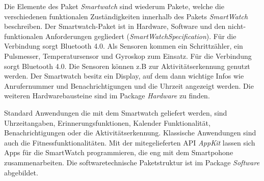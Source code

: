 Die Elemente des Paket \textit{Smartwatch} sind wiederum Pakete, welche die verschiedenen funktionalen Zuständigkeiten innerhalb des Pakets \textit{SmartWatch} beschreiben.
Der Smartwatch-Paket ist in Hardware, Software und den nicht-funktionalen Anforderungen
gegliedert (\textit{SmartWatchSpecification}).
Für die Verbindung sorgt Bluetooth 4.0.
Als Sensoren kommen ein Schrittzähler, ein Pulsmesser, Temperatursensor und Gyroskop zum Einsatz. Für die Verbindung sorgt Bluetooth 4.0.
Die Sensoren können z.B zur Aktivitätserkennung genutzt werden.
Der Smartwatch besitz ein Display, auf dem dann wichtige Infos wie Anrufernummer und Benachrichtigungen und die Uhrzeit angezeigt werden.
Die weiteren Hardwarebausteine sind im Package \textit{Hardware} zu finden.

Standard Anwendungen die mit dem Smartwatch geliefert werden, sind Uhrzeitangaben, Erinnerungsfunktionen, Kalender Funktionalität, Benachrichtigungen oder die Aktivitätserkennung. Klassische Anwendungen sind auch die Fitnessfunktionalitäten.
Mit der mitegelieferten API \textit{AppKit} lassen sich Apps für die SmartWatch programmieren, die eng mit dem Smartpohone zusammenarbeiten.
Die softwaretechnische Paketstruktur ist im Package \textit{Software} abgebildet.


